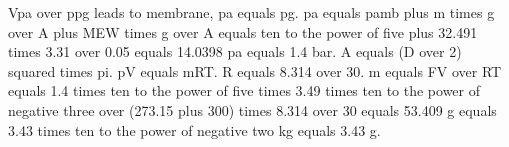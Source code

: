 Vpa over ppg leads to membrane, pa equals pg.  
pa equals pamb plus m times g over A plus MEW times g over A equals ten to the power of five plus 32.491 times 3.31 over 0.05 equals 14.0398 pa equals 1.4 bar.  
A equals (D over 2) squared times pi.  
pV equals mRT.  
R equals 8.314 over 30.  
m equals FV over RT equals 1.4 times ten to the power of five times 3.49 times ten to the power of negative three over (273.15 plus 300) times 8.314 over 30 equals 53.409 g equals 3.43 times ten to the power of negative two kg equals 3.43 g.